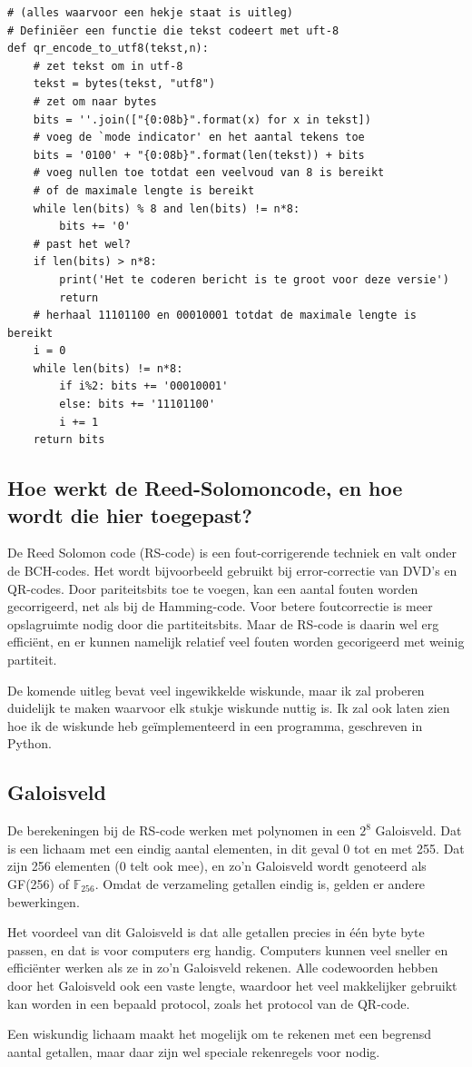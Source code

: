 \documentclass{article}
\begin{document}
\begin{verbatim}
# (alles waarvoor een hekje staat is uitleg)
# Definiëer een functie die tekst codeert met uft-8
def qr_encode_to_utf8(tekst,n):
    # zet tekst om in utf-8
    tekst = bytes(tekst, "utf8")
    # zet om naar bytes
    bits = ''.join(["{0:08b}".format(x) for x in tekst])
    # voeg de `mode indicator' en het aantal tekens toe
    bits = '0100' + "{0:08b}".format(len(tekst)) + bits
    # voeg nullen toe totdat een veelvoud van 8 is bereikt
    # of de maximale lengte is bereikt
    while len(bits) % 8 and len(bits) != n*8:
        bits += '0'
    # past het wel?
    if len(bits) > n*8:
        print('Het te coderen bericht is te groot voor deze versie')
        return
    # herhaal 11101100 en 00010001 totdat de maximale lengte is bereikt
    i = 0
    while len(bits) != n*8:
        if i%2: bits += '00010001'
        else: bits += '11101100'
        i += 1
    return bits
\end{verbatim}
\subsection{Hoe werkt de Reed-Solomoncode, en hoe wordt die hier toegepast?}
De Reed Solomon code (RS-code) is een fout-corrigerende techniek en valt onder de BCH-codes. Het wordt bijvoorbeeld gebruikt bij error-correctie van DVD's en QR-codes. Door pariteitsbits toe te voegen, kan een aantal fouten worden gecorrigeerd, net als bij de Hamming-code. Voor betere foutcorrectie is meer opslagruimte nodig door die partiteitsbits. Maar de RS-code is daarin wel erg efficiënt, en er kunnen namelijk relatief veel fouten worden gecorigeerd met weinig partiteit. \par
De komende uitleg bevat veel ingewikkelde wiskunde, maar ik zal proberen duidelijk te maken waarvoor elk stukje wiskunde nuttig is. Ik zal ook laten zien hoe ik de wiskunde heb geïmplementeerd in een programma, geschreven in Python.

\subsection*{Galoisveld}
De berekeningen bij de RS-code werken met polynomen in een $2^8$ Galoisveld. Dat is een lichaam met een eindig aantal elementen, in dit geval 0 tot en met 255. Dat zijn 256 elementen (0 telt ook mee), en zo'n Galoisveld wordt genoteerd als GF(256) of $\mathbb{F}_{256}$. Omdat de verzameling getallen eindig is, gelden er andere bewerkingen.\par
Het voordeel van dit Galoisveld is dat alle getallen precies in één byte byte passen, en dat is voor computers erg handig. Computers kunnen veel sneller en efficiënter werken als ze in zo'n Galoisveld rekenen. Alle codewoorden hebben door het Galoisveld ook een vaste lengte, waardoor het veel makkelijker gebruikt kan worden in een bepaald protocol, zoals het protocol van de QR-code.\par
Een wiskundig lichaam maakt het mogelijk om te rekenen met een begrensd aantal getallen, maar daar zijn wel speciale rekenregels voor nodig.
\end{document}
